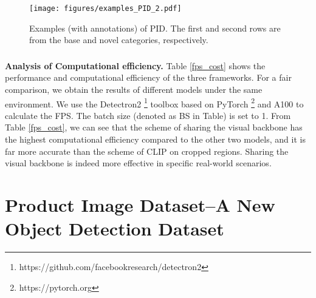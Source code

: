 \documentclass[sigconf]{acmart}
\begin{document}
\begin{figure*}[t]
    \centering
    \texttt{[image: figures/examples\_PID\_2.pdf]} 
    \caption{Examples (with annotations) of PID. The first and second rows are from the base and novel categories, respectively.
    }
    \label{fig:example_PID}
\end{figure*}



\subsubsection{}

\textbf{Analysis of Computational efficiency.} Table \ref{fps_cost} shows the performance and computational efficiency of the three frameworks. For a fair comparison, we obtain the results of different models under the same environment. We use the Detectron2 
\footnote{https://github.com/facebookresearch/detectron2}
toolbox based on PyTorch
\footnote{https://pytorch.org}
and  A100  to calculate the FPS. The batch size (denoted as BS in Table) is set to 1. From Table \ref{fps_cost}, we can see that the scheme of sharing the visual backbone has the highest computational efficiency compared to the other two models, and it is far more accurate than the scheme of CLIP on cropped regions. Sharing the visual backbone is indeed more effective in specific real-world scenarios.


\begin{table}[t]
\caption{Comparisons of the computational efficiency over ResNet50 on OVD-COCO.}
      \centering
      \label{fps_cost}
\end{table}





\section{Product Image Dataset--A New Object Detection Dataset}
\end{document}
